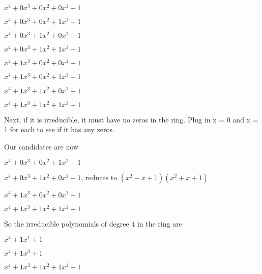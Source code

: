 \documentclass[12pt]{article}
\begin{document}
\begin{itemize}
 $x^4 + 0x^3 + 0x^2 + 0x^1 + 1$


 $x^4 + 0x^3 + 0x^2 + 1x^1 + 1$


 $x^4 + 0x^3 + 1x^2 + 0x^1 + 1$


 $x^4 + 0x^3 + 1x^2 + 1x^1 + 1$


 $x^4 + 1x^3 + 0x^2 + 0x^1 + 1$


 $x^4 + 1x^3 + 0x^2 + 1x^1 + 1$


 $x^4 + 1x^3 + 1x^2 + 0x^1 + 1$


 $x^4 + 1x^3 + 1x^2 + 1x^1 + 1$

 Next, if it is irreducible, it must have no zeros in the ring. Plug in x = 0 and x = 1 for each to see if it has any zeros.

 Our candidates are now

 $x^4 + 0x^3 + 0x^2 + 1x^1 + 1$

 $x^4 + 0x^3 + 1x^2 + 0x^1 + 1$, reduces to $(x^2 - x + 1)(x^2 + x + 1)$

 $x^4 + 1x^3 + 0x^2 + 0x^1 + 1$

 $x^4 + 1x^3 + 1x^2 + 1x^1 + 1$

 So the irreducible polynomials of degree 4 in the ring are

 $x^4 + 1x^1 + 1$

 $x^4 + 1x^3 + 1$

 $x^4 + 1x^3 + 1x^2 + 1x^1 + 1$
  
\end{itemize}
\end{document}
